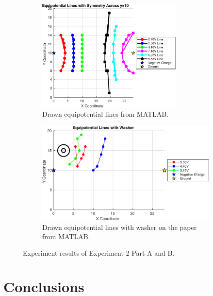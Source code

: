 \documentclass[11pt]{article}
\begin{document}
\begin{figure}[H]
    \begin{subfigure}{0.5\textwidth}
\centering
\includegraphics[width=0.8\textwidth]{EquipotentialLines.eps}
\caption{Drawn equipotential lines from MATLAB.}
\label{sfig:eq}
    \end{subfigure}
    \begin{subfigure}{0.5\textwidth}
\centering
\includegraphics[width=1\textwidth]{EquipotentialLinesWithWasher.eps}
\caption{Drawn equipotential lines with washer on the paper from MATLAB.}
\label{sfig:eqwasher}
    \end{subfigure}
    \caption{Experiment results of Experiment 2 Part A and B.}
    \label{fig:exp2data}
\end{figure}


\vspace{-1cm}
\section{Conclusions}
\end{document}
